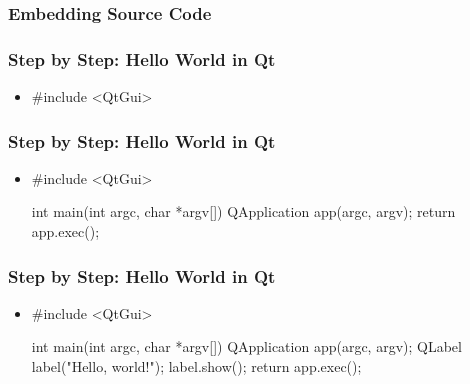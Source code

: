 \begin{slide}[fragile]
  \frametitle{Embedding Source Code}
\end{slide}

\begin{slide}[fragile]
  \frametitle{Step by Step: Hello World in Qt}
  \begin{itemize}
  \item[]
    \begin{cpp}
#include <QtGui>
    \end{cpp}
  \end{itemize}
\end{slide}

\begin{slide}[fragile]
  \frametitle{Step by Step: Hello World in Qt}
  \begin{itemize}
  \item[]
    \begin{cpp}
#include <QtGui>

int main(int argc, char *argv[])
{
    QApplication app(argc, argv);
    return app.exec();
}
    \end{cpp}
  \end{itemize}
\end{slide}

\begin{slide}[fragile]
  \frametitle{Step by Step: Hello World in Qt}
  \begin{itemize}
  \item[]
    \begin{cpp}
#include <QtGui>

int main(int argc, char *argv[])
{
    QApplication app(argc, argv);
    QLabel label("Hello, world!");
    label.show();
    return app.exec();
}
    \end{cpp}
  \end{itemize}
\end{slide}
